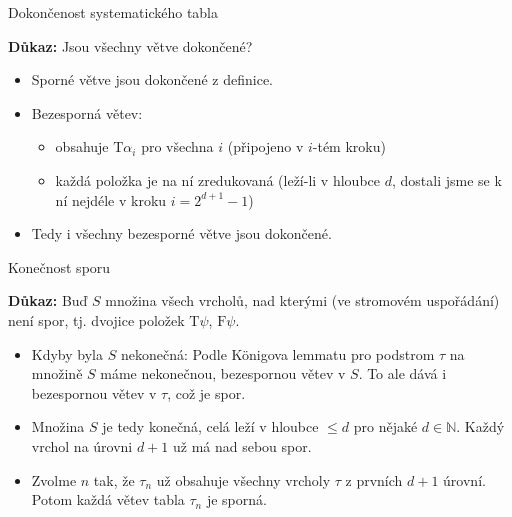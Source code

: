 \documentclass{beamer}
\begin{document}
\begin{frame}{Dokončenost systematického tabla}


    \pause
    \textbf{Důkaz:} 
    Jsou všechny větve dokončené?\pause

    \begin{itemize}
        \item Sporné větve jsou dokončené z definice.\pause
        \item Bezesporná větev:\pause
        \begin{itemize}
            \item \alert{obsahuje $\mathrm{T}\alpha_i$} pro všechna $i$ (připojeno v $i$-tém kroku)\pause
            \item každá položka je na ní \alert{zredukovaná} (leží-li v hloubce $d$, dostali jsme se k ní nejdéle v kroku $i=2^{d+1}-1$)\pause
        \end{itemize}  
        \item Tedy i všechny bezesporné větve jsou dokončené.\hfill\qedsymbol        
    \end{itemize}  

\end{frame}


\begin{frame}{Konečnost sporu}


    \pause
    \textbf{Důkaz:} 
    Buď $S$ množina všech vrcholů, nad kterými (ve stromovém uspořádání) není spor, tj. dvojice položek $\mathrm{T}\psi$, $\mathrm{F}\psi$.\pause

    \begin{itemize}[<+->]
        \item \alert{Kdyby byla $S$ nekonečná:} Podle Königova lemmatu pro podstrom $\tau$ na množině $S$ máme nekonečnou, bezespornou větev v $S$. To ale dává i \alert{bezespornou větev v $\tau$}, což je spor. 
    
        \item \alert{Množina $S$ je tedy konečná,} celá leží v hloubce $\leq d$ pro nějaké $d\in\mathbb N$. Každý vrchol \alert{na úrovni $d+1$ už má nad sebou spor}. 
        
        \item Zvolme $n$ tak, že $\tau_n$ už obsahuje všechny vrcholy $\tau$ z prvních $d+1$ úrovní. Potom každá větev tabla $\tau_n$ je sporná.\hfill\qedsymbol
    \end{itemize}    

\end{frame}
\end{document}
